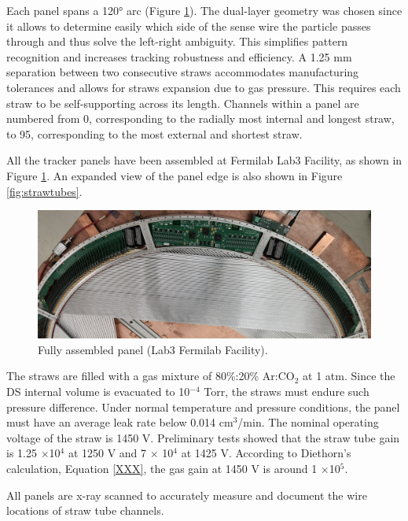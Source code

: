 Each panel spans a 120° arc (Figure \ref{fig:gonzalo}).
The dual-layer geometry was chosen since it allows to determine 
easily which side of the sense wire the particle passes through 
and thus solve the left-right ambiguity. This simplifies pattern 
recognition and increases tracking robustness and efficiency. 
A 1.25 mm separation between two consecutive straws accommodates 
manufacturing tolerances and allows for straws expansion due to gas 
pressure. This requires each straw to be self-supporting across its 
length. Channels within a panel are numbered from 0, 
corresponding to the radially most internal and longest straw, 
to 95, corresponding to the most external and shortest straw. 
   
All the tracker panels have been assembled at Fermilab Lab3 
Facility, as shown in Figure \ref{fig:gonzalo}. An expanded view 
of the panel edge is also shown in Figure \ref{fig:strawtubes}.
            \begin{figure}[!h]
                \centering
                \includegraphics[width =\textwidth]{figures/png/image.png}
                \caption{Fully assembled panel (Lab3 Fermilab Facility).}
                \label{fig:gonzalo}
                \end{figure}

            The straws are filled with a gas mixture of 80\%:20\% Ar:CO$_2$ at 1 atm.
            Since the DS internal volume is evacuated to 10$^{-4}$ Torr, 
            the straws must endure such pressure difference. Under normal temperature and 
            pressure conditions, the panel must have an average leak rate below 0.014 cm$^3$/min.  
            The nominal operating voltage of the straw is 1450 V. 
            Preliminary tests showed that the straw 
            tube gain is 1.25 $\times$10$^4$ at 1250 V and 7 $\times$ 10$^4$ at 
            1425 V. According to Diethorn's calculation, Equation \ref{XXX}, 
            the gas gain at 1450 V is around 1 $\times$10$^5$.
 

All panels are x-ray scanned 
to accurately measure and document the wire 
locations of straw tube channels. 

